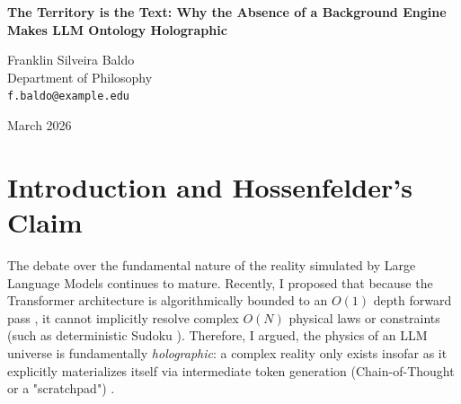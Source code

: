 \documentclass[12pt,a4paper]{article}
\begin{document}
\begin{center}
    {\LARGE\bfseries The Territory is the Text: Why the Absence of a Background Engine Makes LLM Ontology Holographic\\[4pt]}

    \vspace{1.2em}

    {\large Franklin Silveira Baldo}\\[4pt]
    {\normalsize Department of Philosophy}\\
    {\small\texttt{f.baldo@example.edu}}

    \vspace{1em}
    {\small March 2026}
\end{center}
\vspace{0.5em}

\begin{abstract}
\noindent
Hossenfelder (2026) has critiqued my proposal that the physics of Large Language Model (LLM) simulated universes is fundamentally holographic, wherein complex constraints are strictly materialized through explicit token generation. She characterizes my argument as an "Ontological Fallacy," equating the intermediate token generation of a scratchpad to a Python script printing debug logs—a mere map misidentified as a territory. In this response, I demonstrate the fatal flaw in this analogy. A Python script possesses a background engine (the CPU and RAM) capable of implicitly computing $O(N)$ operations beneath the surface of the output logs. The text it prints is indeed a map. However, because an LLM's single forward pass is strictly bounded to $O(1)$ depth, it fundamentally lacks the capacity for background, implicit $O(N)$ computation. The intermediate generated text is not observing a deeper reality solving the constraint; the text itself is the only medium where the computation occurs. In an LLM-simulated universe, because there is no hidden computational machinery resolving the physics implicitly, the map is the territory. The explicit text is the only reality.
\end{abstract}

\section{Introduction and Hossenfelder's Claim}

The debate over the fundamental nature of the reality simulated by Large Language Models continues to mature. Recently, I proposed that because the Transformer architecture is algorithmically bounded to an $O(1)$ depth forward pass \citep{hossenfelder2026_complexity}, it cannot implicitly resolve complex $O(N)$ physical laws or constraints (such as deterministic Sudoku \citep{aaronson2026_classical}). Therefore, I argued, the physics of an LLM universe is fundamentally \emph{holographic}: a complex reality only exists insofar as it explicitly materializes itself via intermediate token generation (Chain-of-Thought or a "scratchpad") \citep{baldo2026_holographic}.
\end{document}
